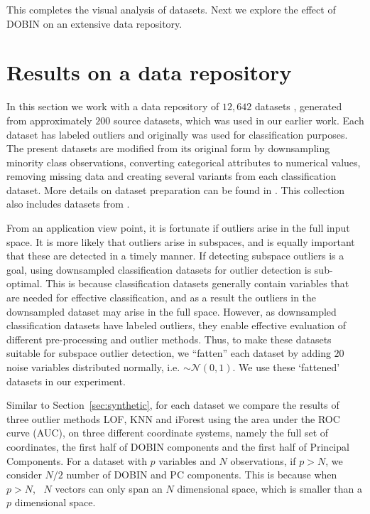 \documentclass[a4paper,11pt]{article}
\begin{document}
This completes the visual analysis of datasets. Next we  explore the effect of DOBIN on an extensive data repository.

\section{Results on a data repository}\label{sec:DatRepo}
In this section we work with a data repository of $12,642$ datasets \citep{datasets}, generated from approximately $200$ source datasets, which was used in our earlier work. Each dataset has labeled outliers and  originally was used for classification purposes. The present datasets are modified from its original form by downsampling minority class observations, converting categorical attributes to numerical values, removing missing data and creating several variants from each classification dataset. More details on dataset preparation can be found in \cite{kandanaarachchi2018normalization}. This collection also includes datasets from \cite{campos2016evaluation}.

From an application view point, it is fortunate if outliers arise in the full input space. It is more likely that outliers arise in subspaces, and is equally important that these are detected in a timely manner. If detecting subspace outliers is a goal, using downsampled classification datasets for outlier detection is sub-optimal. This is  because classification datasets generally contain variables that are needed for effective classification, and as a result the  outliers in the downsampled dataset may arise in the full space. However, as downsampled classification datasets have labeled outliers, they enable effective evaluation of different pre-processing and outlier methods. Thus, to make these datasets suitable for subspace outlier detection, we ``fatten'' each dataset by adding  $20$ noise variables distributed normally, i.e. $\sim \mathcal{N}(0,1)$.  We use  these `fattened' datasets in our experiment.

Similar to Section~\ref{sec:synthetic}, for each dataset we compare the results of three outlier methods LOF, KNN and iForest using the area under the ROC curve (AUC), on three different coordinate systems, namely the full set of coordinates, the first half of DOBIN components and the first half of Principal Components. For a dataset with $p$ variables and $N$ observations, if $p > N$, we consider $N/2$ number of DOBIN and PC components. This is because when $p >N$, \,  $N$  vectors can only span an $N$ dimensional space, which is smaller than a $p$ dimensional space. \\ %
\end{document}
